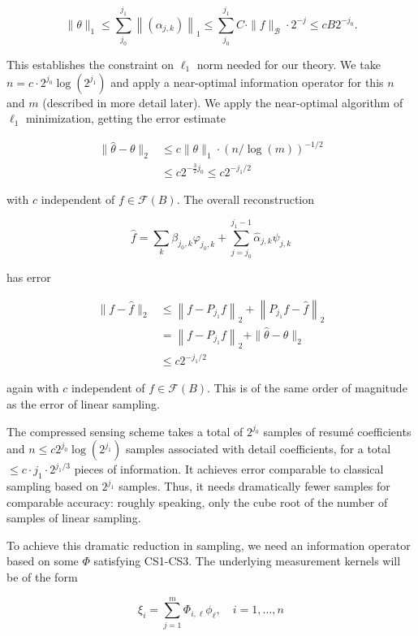 \documentclass[10pt]{article}
\begin{document}
$$
\|\theta\|_{1} \leq \sum_{j_{0}}^{j_{1}}\left\|\left(\alpha_{j, k}\right)\right\|_{1} \leq \sum_{j_{0}}^{j_{1}} C \cdot\|f\|_{\mathcal{B}} \cdot 2^{-j} \leq c B 2^{-j_{0}} .
$$

This establishes the constraint on $\ell_{1}$ norm needed for our theory. We take $n=c \cdot 2^{j_{0}} \log \left(2^{j_{1}}\right)$ and apply a near-optimal information operator for this $n$ and $m$ (described in more detail later). We apply the near-optimal algorithm of $\ell_{1}$ minimization, getting the error estimate

$$
\begin{aligned}
\|\hat{\theta}-\theta\|_{2} & \leq c\|\theta\|_{1} \cdot(n / \log (m))^{-1 / 2} \\
& \leq c 2^{-\frac{3}{2} j_{0}} \leq c 2^{-j_{1} / 2}
\end{aligned}
$$

with $c$ independent of $f \in \mathcal{F}(B)$. The overall reconstruction

$$
\hat{f}=\sum_{k} \beta_{j_{0}, k} \varphi_{j_{0}, k}+\sum_{j=j_{0}}^{j_{1}-1} \hat{\alpha}_{j, k} \psi_{j, k}
$$

has error

$$
\begin{aligned}
\|f-\hat{f}\|_{2} & \leq\left\|f-P_{j_{1}} f\right\|_{2}+\left\|P_{j_{1}} f-\hat{f}\right\|_{2} \\
& =\left\|f-P_{j_{1}} f\right\|_{2}+\|\hat{\theta}-\theta\|_{2} \\
& \leq c 2^{-j_{1} / 2}
\end{aligned}
$$

again with $c$ independent of $f \in \mathcal{F}(B)$. This is of the same order of magnitude as the error of linear sampling.

The compressed sensing scheme takes a total of $2^{j_{0}}$ samples of resumé coefficients and $n \leq c 2^{j_{0}} \log \left(2^{j_{1}}\right)$ samples associated with detail coefficients, for a total $\leq c \cdot j_{1} \cdot 2^{j_{1} / 3}$ pieces of information. It achieves error comparable to classical sampling based on $2^{j_{1}}$ samples. Thus, it needs dramatically fewer samples for comparable accuracy: roughly speaking, only the cube root of the number of samples of linear sampling.

To achieve this dramatic reduction in sampling, we need an information operator based on some $\Phi$ satisfying CS1-CS3. The underlying measurement kernels will be of the form


\begin{equation*}
\xi_{i}=\sum_{j=1}^{m} \Phi_{i, \ell} \phi_{\ell}, \quad i=1, \ldots, n \tag{VI.1}
\end{equation*}
\end{document}
